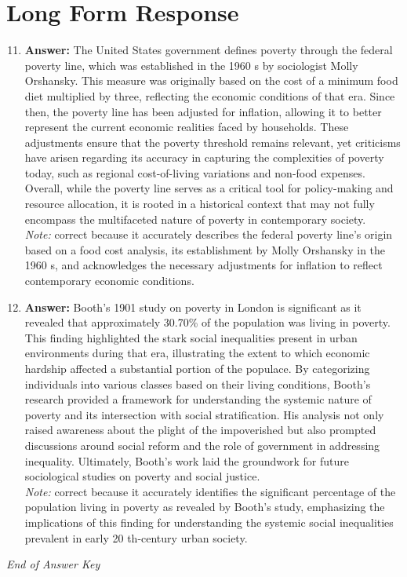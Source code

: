 \documentclass[12pt]{article}
\begin{document}
\section*{Long Form Response}
\begin{enumerate}[label=\arabic*.]
\setcounter{enumi}{10}
\item \textbf{Answer:} The United States government defines poverty through the federal poverty line, which was established in the 1960 s by sociologist Molly Orshansky. This measure was originally based on the cost of a minimum food diet multiplied by three, reflecting the economic conditions of that era. Since then, the poverty line has been adjusted for inflation, allowing it to better represent the current economic realities faced by households. These adjustments ensure that the poverty threshold remains relevant, yet criticisms have arisen regarding its accuracy in capturing the complexities of poverty today, such as regional cost-of-living variations and non-food expenses. Overall, while the poverty line serves as a critical tool for policy-making and resource allocation, it is rooted in a historical context that may not fully encompass the multifaceted nature of poverty in contemporary society.
\\ \textit{Note:} correct because it accurately describes the federal poverty line's origin based on a food cost analysis, its establishment by Molly Orshansky in the 1960 s, and acknowledges the necessary adjustments for inflation to reflect contemporary economic conditions.
\item \textbf{Answer:} Booth's 1901 study on poverty in London is significant as it revealed that approximately 30.70\% of the population was living in poverty. This finding highlighted the stark social inequalities present in urban environments during that era, illustrating the extent to which economic hardship affected a substantial portion of the populace. By categorizing individuals into various classes based on their living conditions, Booth's research provided a framework for understanding the systemic nature of poverty and its intersection with social stratification. His analysis not only raised awareness about the plight of the impoverished but also prompted discussions around social reform and the role of government in addressing inequality. Ultimately, Booth's work laid the groundwork for future sociological studies on poverty and social justice.
\\ \textit{Note:} correct because it accurately identifies the significant percentage of the population living in poverty as revealed by Booth's study, emphasizing the implications of this finding for understanding the systemic social inequalities prevalent in early 20 th-century urban society.
\end{enumerate}

\vfill
\noindent\textit{End of Answer Key}
\end{document}
